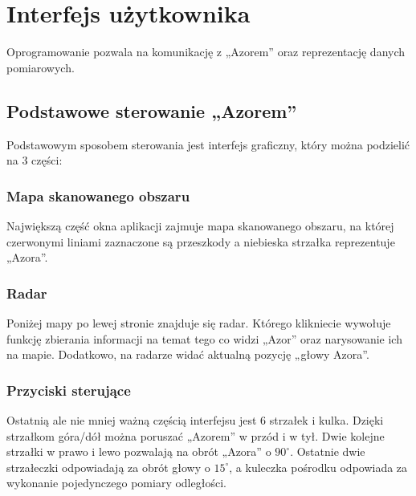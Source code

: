 \section{Interfejs użytkownika}
    \tab Oprogramowanie pozwala na komunikację z „Azorem” oraz reprezentację danych pomiarowych.

    

    \subsection{Podstawowe sterowanie „Azorem”}
        \tab Podstawowym sposobem sterowania jest interfejs graficzny, który można podzielić na 3 części:

        \subsubsection{Mapa skanowanego obszaru}        
            \tab Największą część okna aplikacji zajmuje mapa skanowanego obszaru, 
            na której czerwonymi liniami zaznaczone są przeszkody a niebieska strzałka reprezentuje „Azora”.

        \subsubsection{Radar}
            \tab Poniżej mapy po lewej stronie znajduje się radar. 
            Którego klikniecie wywołuje funkcję zbierania informacji na temat tego co widzi „Azor” oraz narysowanie ich na mapie. 
            Dodatkowo, na radarze widać aktualną pozycję „głowy Azora”.
        
        \subsubsection{Przyciski sterujące}
            \tab Ostatnią ale nie mniej ważną częścią interfejsu jest 6 strzałek i kulka. 
            Dzięki strzałkom góra/dół można poruszać „Azorem” w przód i w tył.
            Dwie kolejne strzałki w prawo i lewo pozwalają na obrót „Azora” o $90^\circ$.
            Ostatnie dwie strzałeczki odpowiadają za obrót głowy o $15^\circ$, a kuleczka pośrodku odpowiada za wykonanie pojedynczego pomiary odległości.

